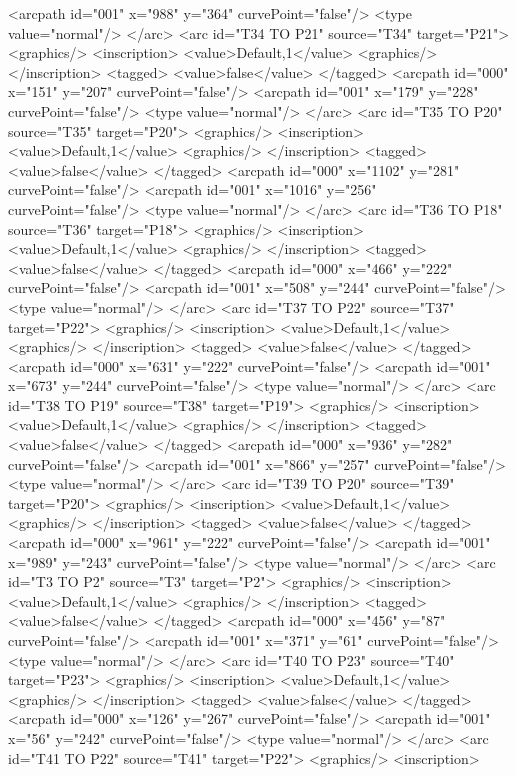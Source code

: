 <arcpath id="001" x="988" y="364" curvePoint="false"/>
<type value="normal"/>
</arc>
<arc id="T34 TO P21" source="T34" target="P21">
<graphics/>
<inscription>
<value>Default,1</value>
<graphics/>
</inscription>
<tagged>
<value>false</value>
</tagged>
<arcpath id="000" x="151" y="207" curvePoint="false"/>
<arcpath id="001" x="179" y="228" curvePoint="false"/>
<type value="normal"/>
</arc>
<arc id="T35 TO P20" source="T35" target="P20">
<graphics/>
<inscription>
<value>Default,1</value>
<graphics/>
</inscription>
<tagged>
<value>false</value>
</tagged>
<arcpath id="000" x="1102" y="281" curvePoint="false"/>
<arcpath id="001" x="1016" y="256" curvePoint="false"/>
<type value="normal"/>
</arc>
<arc id="T36 TO P18" source="T36" target="P18">
<graphics/>
<inscription>
<value>Default,1</value>
<graphics/>
</inscription>
<tagged>
<value>false</value>
</tagged>
<arcpath id="000" x="466" y="222" curvePoint="false"/>
<arcpath id="001" x="508" y="244" curvePoint="false"/>
<type value="normal"/>
</arc>
<arc id="T37 TO P22" source="T37" target="P22">
<graphics/>
<inscription>
<value>Default,1</value>
<graphics/>
</inscription>
<tagged>
<value>false</value>
</tagged>
<arcpath id="000" x="631" y="222" curvePoint="false"/>
<arcpath id="001" x="673" y="244" curvePoint="false"/>
<type value="normal"/>
</arc>
<arc id="T38 TO P19" source="T38" target="P19">
<graphics/>
<inscription>
<value>Default,1</value>
<graphics/>
</inscription>
<tagged>
<value>false</value>
</tagged>
<arcpath id="000" x="936" y="282" curvePoint="false"/>
<arcpath id="001" x="866" y="257" curvePoint="false"/>
<type value="normal"/>
</arc>
<arc id="T39 TO P20" source="T39" target="P20">
<graphics/>
<inscription>
<value>Default,1</value>
<graphics/>
</inscription>
<tagged>
<value>false</value>
</tagged>
<arcpath id="000" x="961" y="222" curvePoint="false"/>
<arcpath id="001" x="989" y="243" curvePoint="false"/>
<type value="normal"/>
</arc>
<arc id="T3 TO P2" source="T3" target="P2">
<graphics/>
<inscription>
<value>Default,1</value>
<graphics/>
</inscription>
<tagged>
<value>false</value>
</tagged>
<arcpath id="000" x="456" y="87" curvePoint="false"/>
<arcpath id="001" x="371" y="61" curvePoint="false"/>
<type value="normal"/>
</arc>
<arc id="T40 TO P23" source="T40" target="P23">
<graphics/>
<inscription>
<value>Default,1</value>
<graphics/>
</inscription>
<tagged>
<value>false</value>
</tagged>
<arcpath id="000" x="126" y="267" curvePoint="false"/>
<arcpath id="001" x="56" y="242" curvePoint="false"/>
<type value="normal"/>
</arc>
<arc id="T41 TO P22" source="T41" target="P22">
<graphics/>
<inscription>
